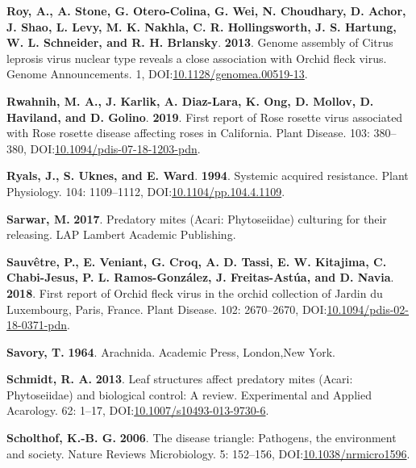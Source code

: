 \documentclass[12pt,final,CPage]{ufthesis}
\newlength{\cslhangindent}
\newenvironment{CSLReferences}[2] %
{%
	\setlength{\parindent}{0pt}
	\ifodd #1 \everypar{\setlength{\hangindent}{\cslhangindent}}\ignorespaces\fi
	\ifnum #2 > 0
	\setlength{\parskip}{#2\baselineskip}
	\fi
}%
{}
\begin{document}
{\begin{CSLReferences}{1}{0}
  \leavevmode{}%
  \textbf{Roy, A., A. Stone, G. Otero-Colina, G. Wei, N. Choudhary, D. Achor, J. Shao, L. Levy, M. K. Nakhla, C. R. Hollingsworth, J. S. Hartung, W. L. Schneider, and R. H. Brlansky}. \textbf{2013}. Genome assembly of {Citrus leprosis virus} nuclear type reveals a close association with {Orchid fleck virus}. Genome Announcements. 1, DOI:\href{https://doi.org/10.1128/genomea.00519-13}{10.1128/genomea.00519-13}.

  \leavevmode{}%
  \textbf{Rwahnih, M. A., J. Karlik, A. Diaz-Lara, K. Ong, D. Mollov, D. Haviland, and D. Golino}. \textbf{2019}. First report of {Rose rosette virus} associated with {Rose rosette disease} affecting roses in {California}. Plant Disease. 103: 380--380, DOI:\href{https://doi.org/10.1094/pdis-07-18-1203-pdn}{10.1094/pdis-07-18-1203-pdn}.

  \leavevmode{}%
  \textbf{Ryals, J., S. Uknes, and E. Ward}. \textbf{1994}. Systemic acquired resistance. Plant Physiology. 104: 1109--1112, DOI:\href{https://doi.org/10.1104/pp.104.4.1109}{10.1104/pp.104.4.1109}.

  \leavevmode{}%
  \textbf{Sarwar, M.} \textbf{2017}. Predatory mites ({Acari}: {Phytoseiidae}) culturing for their releasing. LAP Lambert Academic Publishing.

  \leavevmode{}%
  \textbf{Sauvêtre, P., E. Veniant, G. Croq, A. D. Tassi, E. W. Kitajima, C. Chabi-Jesus, P. L. Ramos-González, J. Freitas-Astúa, and D. Navia}. \textbf{2018}. First report of {Orchid fleck virus} in the orchid collection of {Jardin du Luxembourg}, {Paris, France}. Plant Disease. 102: 2670--2670, DOI:\href{https://doi.org/10.1094/pdis-02-18-0371-pdn}{10.1094/pdis-02-18-0371-pdn}.

  \leavevmode{}%
  \textbf{Savory, T.} \textbf{1964}. Arachnida. Academic Press, London,New York.

  \leavevmode{}%
  \textbf{Schmidt, R. A.} \textbf{2013}. Leaf structures affect predatory mites ({Acari}: {Phytoseiidae}) and biological control: A review. Experimental and Applied Acarology. 62: 1--17, DOI:\href{https://doi.org/10.1007/s10493-013-9730-6}{10.1007/s10493-013-9730-6}.

  \leavevmode{}%
  \textbf{Scholthof, K.-B. G.} \textbf{2006}. The disease triangle: Pathogens, the environment and society. Nature Reviews Microbiology. 5: 152--156, DOI:\href{https://doi.org/10.1038/nrmicro1596}{10.1038/nrmicro1596}.


\end{CSLReferences}}
\end{document}
